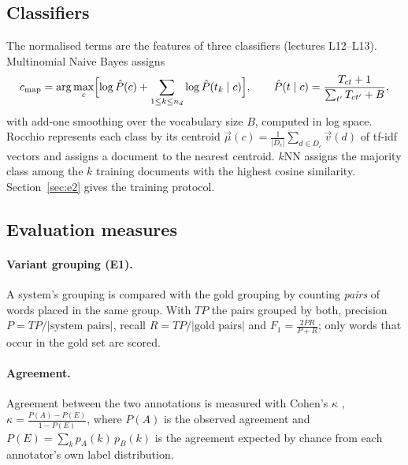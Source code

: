 \subsection{Classifiers}
\label{sec:classifiers}

The normalised terms are the features of three classifiers (lectures L12--L13). Multinomial Naive
Bayes assigns
\begin{equation}
c_{\mathrm{map}}=\arg\max_{c}\Bigl[\log\hat P(c)+\sum_{1\le k\le n_d}\log\hat P(t_k\mid c)\Bigr],
\qquad
\hat P(t\mid c)=\frac{T_{ct}+1}{\sum_{t'}T_{ct'}+B},
\end{equation}
with add-one smoothing over the vocabulary size $B$, computed in log space. Rocchio represents each
class by its centroid $\vec\mu(c)=\frac{1}{|D_c|}\sum_{d\in D_c}\vec v(d)$ of tf-idf vectors and
assigns a document to the nearest centroid. $k$NN assigns the majority class among the $k$ training
documents with the highest cosine similarity. Section~\ref{sec:e2} gives the training protocol.

\subsection{Evaluation measures}
\label{sec:measures}

\paragraph{Variant grouping (E1).} A system's grouping is compared with the gold grouping by
counting \emph{pairs} of words placed in the same group. With $\mathit{TP}$ the pairs grouped by
both, precision $P=\mathit{TP}/|\text{system pairs}|$, recall $R=\mathit{TP}/|\text{gold pairs}|$ and
$F_1=\frac{2PR}{P+R}$; only words that occur in the gold set are scored.

\paragraph{Agreement.} Agreement between the two annotations is measured with Cohen's $\kappa$
\citep[Section~8.5]{manning2008iir}, $\kappa=\frac{P(A)-P(E)}{1-P(E)}$, where $P(A)$ is the observed
agreement and $P(E)=\sum_k p_A(k)\,p_B(k)$ is the agreement expected by chance from each annotator's
own label distribution.

